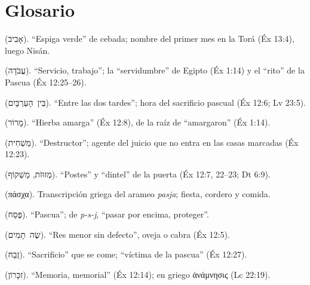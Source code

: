 \documentclass[11pt,letterpaper]{article}
\newcommand{\heb}[1]{\mbox{\foreignlanguage{hebrew}{#1}}}
\newcommand{\grc}[1]{\foreignlanguage{ancientgreek}{#1}}
\begin{document}
\section*{Glosario}
\begin{description}\setlength{\itemsep}{2pt}
\item[Abib] (\heb{אָבִיב}). ``Espiga verde'' de cebada; nombre del primer mes en la Torá (Éx 13:4), luego Nisán.
\item[\emph{Avodá}] (\heb{עֲבֹדָה}). ``Servicio, trabajo''; la ``servidumbre'' de Egipto (Éx 1:14) y el ``rito'' de la Pascua (Éx 12:25--26).
\item[\emph{Bein ha'arbayim}] (\heb{בֵּין הָעַרְבָּיִם}). ``Entre las dos tardes''; hora del sacrificio pascual (Éx 12:6; Lv 23:5).
\item[\emph{Maror}] (\heb{מָרוֹר}). ``Hierba amarga'' (Éx 12:8), de la raíz de ``amargaron'' (Éx 1:14).
\item[\emph{Mashjit}] (\heb{מַשְׁחִית}). ``Destructor''; agente del juicio que no entra en las casas marcadas (Éx 12:23).
\item[\emph{Mezuzot} y \emph{mashqof}] (\heb{מְזוּזֹת}, \heb{מַשְׁקוֹף}). ``Postes'' y ``dintel'' de la puerta (Éx 12:7, 22--23; Dt 6:9).
\item[\emph{Pascha}] (\grc{πάσχα}). Transcripción griega del arameo \emph{pasja}; fiesta, cordero y comida.
\item[\emph{Pésaj}] (\heb{פֶּסַח}). ``Pascua''; de \emph{p-s-j}, ``pasar por encima, proteger''.
\item[\emph{Seh tamim}] (\heb{שֶׂה תָמִים}). ``Res menor sin defecto'', oveja o cabra (Éx 12:5).
\item[\emph{Zevaj}] (\heb{זֶבַח}). ``Sacrificio'' que se come; ``víctima de la pascua'' (Éx 12:27).
\item[\emph{Zikarón}] (\heb{זִכָּרוֹן}). ``Memoria, memorial'' (Éx 12:14); en griego \grc{ἀνάμνησις} (Lc 22:19).
\end{description}

\end{document}
